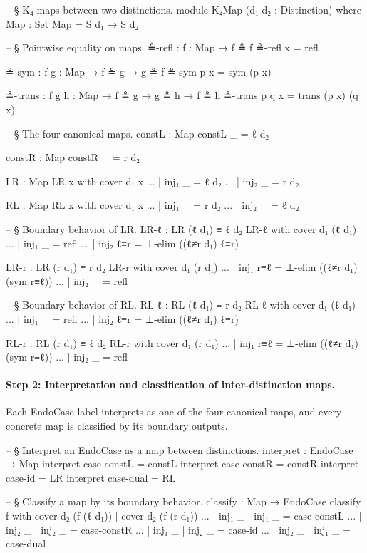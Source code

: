 \documentclass[11pt,a4paper]{book}
\def\texttt#1{#1}%
\begin{document}
\begin{code}
-- § K₄ maps between two distinctions.
module K₄Map (d₁ d₂ : Distinction) where
  Map : Set
  Map = S d₁ → S d₂

  -- § Pointwise equality on maps.
  ≗-refl : {f : Map} → f ≗ f
  ≗-refl x = refl

  ≗-sym : {f g : Map} → f ≗ g → g ≗ f
  ≗-sym p x = sym (p x)

  ≗-trans : {f g h : Map} → f ≗ g → g ≗ h → f ≗ h
  ≗-trans p q x = trans (p x) (q x)

  -- § The four canonical maps.
  constL : Map
  constL _ = ℓ d₂

  constR : Map
  constR _ = r d₂

  LR : Map
  LR x with cover d₁ x
  ... | inj₁ _ = ℓ d₂
  ... | inj₂ _ = r d₂

  RL : Map
  RL x with cover d₁ x
  ... | inj₁ _ = r d₂
  ... | inj₂ _ = ℓ d₂

  -- § Boundary behavior of LR.
  LR-ℓ : LR (ℓ d₁) ≡ ℓ d₂
  LR-ℓ with cover d₁ (ℓ d₁)
  ... | inj₁ _   = refl
  ... | inj₂ ℓ≡r = ⊥-elim ((ℓ≠r d₁) ℓ≡r)

  LR-r : LR (r d₁) ≡ r d₂
  LR-r with cover d₁ (r d₁)
  ... | inj₁ r≡ℓ = ⊥-elim ((ℓ≠r d₁) (sym r≡ℓ))
  ... | inj₂ _   = refl

  -- § Boundary behavior of RL.
  RL-ℓ : RL (ℓ d₁) ≡ r d₂
  RL-ℓ with cover d₁ (ℓ d₁)
  ... | inj₁ _   = refl
  ... | inj₂ ℓ≡r = ⊥-elim ((ℓ≠r d₁) ℓ≡r)

  RL-r : RL (r d₁) ≡ ℓ d₂
  RL-r with cover d₁ (r d₁)
  ... | inj₁ r≡ℓ = ⊥-elim ((ℓ≠r d₁) (sym r≡ℓ))
  ... | inj₂ _   = refl
\end{code}

\paragraph{Step 2: Interpretation and classification of inter-distinction maps.}
Each \texttt{EndoCase} label interprets as one of the four canonical maps, and every concrete map is classified by its boundary outputs.

\begin{code}
  -- § Interpret an EndoCase as a map between distinctions.
  interpret : EndoCase → Map
  interpret case-constL = constL
  interpret case-constR = constR
  interpret case-id     = LR
  interpret case-dual   = RL

  -- § Classify a map by its boundary behavior.
  classify : Map → EndoCase
  classify f with cover d₂ (f (ℓ d₁)) | cover d₂ (f (r d₁))
  ... | inj₁ _ | inj₁ _ = case-constL
  ... | inj₂ _ | inj₂ _ = case-constR
  ... | inj₁ _ | inj₂ _ = case-id
  ... | inj₂ _ | inj₁ _ = case-dual
\end{code}
\end{document}
